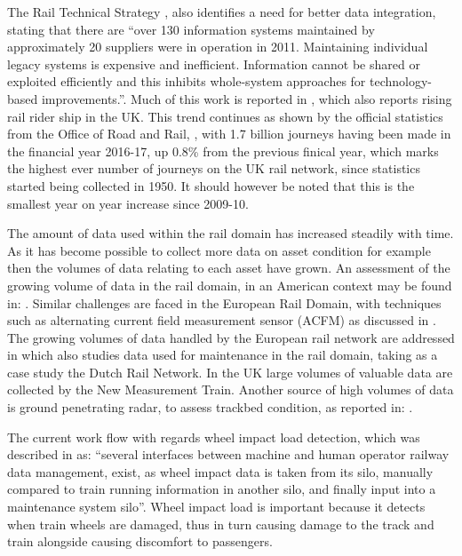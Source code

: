 The Rail Technical Strategy \cite{TechnicalStrategyLeadershipGroup2012b}, also identifies a need for better data integration, stating that there are ``over 130 information systems maintained by approximately 20 suppliers were in operation in 2011. Maintaining individual legacy systems is expensive and inefficient. Information cannot be shared or exploited efficiently and this inhibits whole-system approaches for technology-based improvements.''. Much of this work is reported in \cite{Morris2014}, which also reports rising rail rider ship in the UK. This trend continues as shown by the official statistics from the Office of Road and Rail, \cite{OfficeofRoad&Rail2016}, with 1.7 billion journeys having been made in the financial year 2016-17, up 0.8\% from the previous finical year, which marks the highest ever number of journeys on the UK rail network, since statistics started being collected in 1950. It should however be noted that this is the smallest year on year increase since 2009-10.

The amount of data used within the rail domain has increased steadily with time. As it has become possible to collect more data on asset condition for example then the volumes of data relating to each asset have grown. An assessment of the growing volume of data in the rail domain, in an American context may be found in: \cite{Zarembski}. Similar challenges are faced in the European Rail Domain, with techniques such as alternating current field measurement sensor (ACFM) as discussed in \cite{Rowshandel2013}. The growing volumes of data handled by the European rail network are addressed in \cite{Nunez2014} which also studies data used for maintenance in the rail domain, taking as a case study the Dutch Rail Network.  In the UK large volumes of valuable data are collected by the New Measurement Train. Another source of high volumes of data is ground penetrating radar, to assess trackbed condition, as reported in: \cite{eriksen2004improved}.

The current work flow with regards wheel impact load detection, which was described in \cite{Tutcher2015} as: ``several interfaces between machine and human operator railway data management,  exist, as wheel impact data is taken from its silo, manually compared to train running information in another silo, and finally input into a maintenance system silo''. Wheel impact load is important because it detects when train wheels are damaged, thus in turn causing damage to the track and train alongside causing discomfort to passengers.

